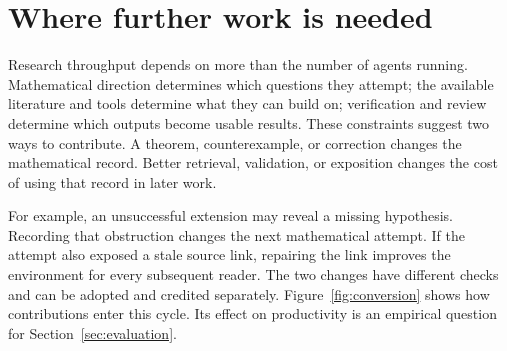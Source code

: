 \documentclass[10pt]{article}
\begin{document}
\section{Where further work is needed}\label{sec:model}

Research throughput depends on more than the number of agents running.
Mathematical direction determines which questions they attempt; the available
literature and tools determine what they can build on; verification and review
determine which outputs become usable results. These constraints suggest two
ways to contribute. A theorem, counterexample, or correction changes the
mathematical record. Better retrieval, validation, or exposition changes the
cost of using that record in later work.

For example, an unsuccessful extension may reveal a missing hypothesis.
Recording that obstruction changes the next mathematical attempt. If the
attempt also exposed a stale source link, repairing the link improves the
environment for every subsequent reader. The two changes have different
checks and can be adopted and credited separately. Figure~\ref{fig:conversion}
shows how contributions enter this cycle. Its effect on productivity is an
empirical question for Section~\ref{sec:evaluation}.
\end{document}
